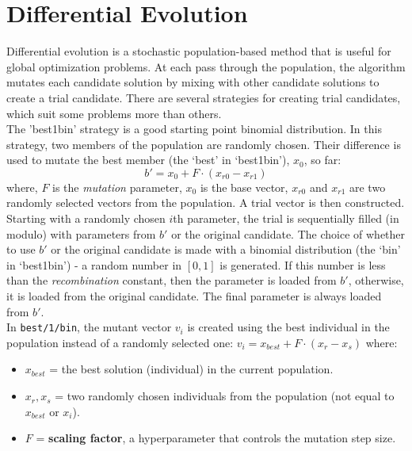 \section{Differential Evolution}
Differential evolution is a stochastic population-based method that is useful for global optimization problems. At each pass through the population, the algorithm mutates each candidate solution by mixing with other candidate solutions to create a trial candidate. There are several strategies for creating trial candidates, which suit some problems more than others.\\
The 'best1bin' strategy is a good starting point binomial distribution. In this strategy, two members of the population are randomly chosen. Their difference is used to mutate the best member (the ‘best’ in ‘best1bin’), $x_0$, so far:
\begin{equation}
    b' = x_0 + F \cdot (x_{r0} - x_{r1})
\end{equation}
where, $F$ is the \textit{mutation} parameter, \(x_0\) is the base vector, \(x_{r0}\) and \(x_{r1}\) are two randomly selected vectors from the population. A trial vector is then constructed. Starting with a randomly chosen $i$th parameter, the trial is sequentially filled (in modulo) with parameters from $b'$ or the original candidate. The choice of whether to use $b'$ or the original candidate is made with a binomial distribution (the ‘bin’ in ‘best1bin’) - a random number in $[0,1]$ is generated. If this number is less than the \textit{recombination} constant, then the parameter is loaded from $b'$, otherwise, it is loaded from the original candidate. The final parameter is always loaded from $b'$.\\
In \texttt{best/1/bin}, the mutant vector \( v_i \) is created using the best individual in the population instead of a randomly selected one:
$
v_i = x_{best} + F \cdot (x_r - x_s)$
where:
\begin{itemize}
    \item \( x_{best} \) = the best solution (individual) in the current population.
    \item \( x_r, x_s \) = two randomly chosen individuals from the population (not equal to \( x_{best} \) or \( x_i \)).
    \item \( F \) = \textbf{scaling factor}, a hyperparameter that controls the mutation step size.
\end{itemize}

